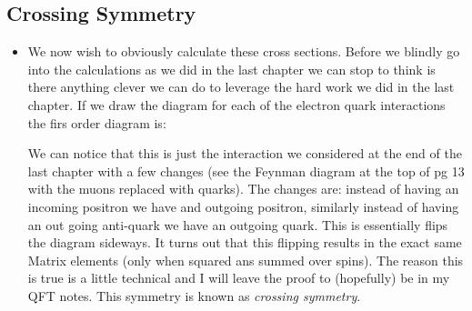 \documentclass[11pt]{article}
\numberwithin{equation}{section}
\begin{document}
\subsection{Crossing Symmetry} %
\label{sub:crossing_symmetry}
\begin{itemize}
    \item We now wish to obviously calculate these cross sections. Before we blindly go into the calculations as we did in the last chapter we can stop to think is there anything clever we can do to leverage the hard work we did in the last chapter. If we draw the diagram for each of the electron quark interactions the firs order diagram is:  
    \begin{figure}[H]
\centering
{}
\end{figure}
We can notice that this is just the interaction we considered at the end of the last chapter with a few changes (see the Feynman diagram at the top of pg 13 with the muons replaced with quarks). The changes are: instead of having an incoming positron we have and outgoing positron, similarly instead of having an out going anti-quark we have an outgoing quark. This is essentially flips the diagram sideways. It turns out that this flipping results in the exact same Matrix elements (only when squared ans summed over spins). The reason this is true is a little technical and I will leave the proof to (hopefully) be in my QFT notes. This symmetry is known as \emph{crossing symmetry}. 


\end{itemize}
\end{document}
